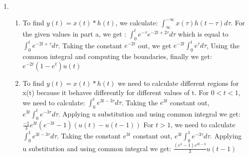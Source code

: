 \documentclass[10pt,a4paper, margin=1in]{article}
\begin{document}
\begin{enumerate}
\item %
    \begin{enumerate}
    \item To find $y(t)= x(t) * h(t)$, we calculate: $\int_{\infty}^{-\infty} x(\tau)h(t-\tau)d\tau$. For the given values in part a, we get : $\int_{0}^{t} e^{-\tau} e^{-2t + 2\tau}d\tau$ which is equal to $\int_{0}^{t} e^{-2t + \tau}d\tau$. Taking the constant $e^{-2t}$ out, we get $e^{-2t}\int_{0}^{t} e^{\tau}d\tau$, Using the common integral and computing the boundaries, finally we get: $e^{-2t}(1-e^{t})u(t)$
    \item To find $y(t)= x(t) * h(t)$ we need to calculate different regions for x(t) because it behaves differently for different values of t. \newline
    For $0<t<1$, we need to calculate: $\int_{0}^{t} e^{3t - 3\tau}d\tau$. Taking the $e^{3t}$ constant out, $e^{3t}\int_{0}^{t} e^{-3\tau}d\tau$. Applying u substitution and using common integral we get: $\frac{-1}{3}e^{3t}(e^{-3t}-1)(u(t)-u(t-1))$ \newline
    For $t>1$, we need to calculate $\int_{0}^{1} e^{3t - 3\tau}d\tau$. Taking the constant $e^{3t}$ constant out, $e^{3t}\int_{0}^{1} e^{-3\tau}d\tau$. Applying u substitution and using common integral we get: $\frac{(e^{3}-1)e^{3t-3}}{3} u(t-1) $
    
    
    
    \end{enumerate}


\end{enumerate}
\end{document}
